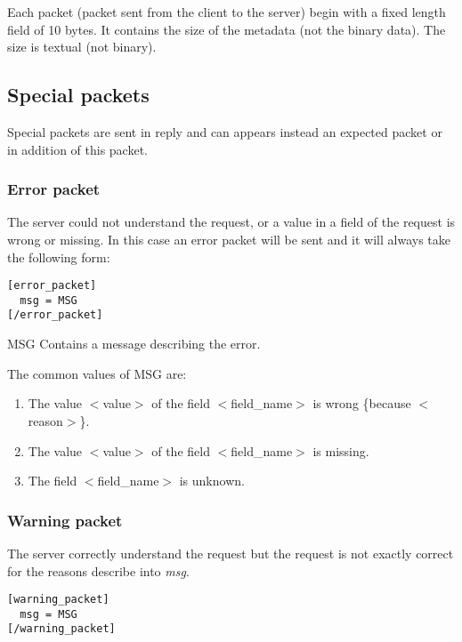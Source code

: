 Each packet (packet sent from the client to the server) begin with a fixed length field of 10 bytes. It contains the size of the metadata (not the binary data). The size is textual (not binary).

\subsection{Special packets}
\label{wire:specialpackets}

Special packets are sent in reply and can appears instead an expected packet or in addition of this packet.

\subsubsection{Error packet}
\label{wire:specialpackets:errorpacket}

 The server could not understand the request, or a value in a field of the request is wrong or missing.
In this case an error packet will be sent and it will always take the following form:
\begin{lstlisting}
[error_packet]
  msg = MSG
[/error_packet]
\end{lstlisting}

\begin{description}
 \item MSG Contains a message describing the error.
\end{description}

The common values of MSG are:

\begin{enumerate}
 \item The value $<$value$>$ of the field $<$field\_name$>$ is wrong \{because $<$reason$>$\}.
 \item The value $<$value$>$ of the field $<$field\_name$>$ is missing.
 \item The field $<$field\_name$>$ is unknown.
\end{enumerate}

\subsubsection{Warning packet}
\label{wire:specialpackets:warningpacket}

The server correctly understand the request but the request is not exactly correct for the reasons describe into \textit{msg}.
\begin{lstlisting}
[warning_packet]
  msg = MSG
[/warning_packet]
\end{lstlisting}

